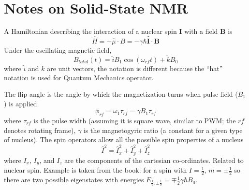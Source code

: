 \documentclass[12pt]{book}
\begin{document}
\section{Notes on Solid-State NMR}

A Hamiltonian describing the interaction of a nuclear spin $\mathbf{I}$
with a field $\mathbf{B}$ is 
\[
\hat{H}=-\hat{\mu}\cdot B=-\gamma\hbar\mathbf{\hat{I}}\cdot\mathbf{B}
\]
Under the oscillating magnetic field, 
\[
B_{total}\left(t\right)=\breve{i}B_{1}\cos\left(\omega_{rf}t\right)+\breve{k}B_{0}
\]
where $\breve{i}$ and $\breve{k}$ are unit vectors, the notation
is different because the ``hat'' notation is used for Quantum Mechanics
operator.

The flip angle is the angle by which the magnetization turns when
pulse field ($B_{1}$) is applied 
\[
\phi_{rf}=\omega_{1}\tau_{rf}=\gamma B_{1}\tau_{rf}
\]
where $\tau_{rf}$ is the pulse width (assuming it is square wave,
similar to PWM; the $rf$ denotes rotating frame), $\gamma$ is the
magnetogyric ratio (a constant for a given type of nucleus). The spin
operators allow all the possible spin properties of a nucleus 
\[
\hat{I}^{2}=\hat{I}_{x}^{2}+\hat{I}_{y}^{2}+\hat{I}_{z}^{2}
\]
where $I_{x}$, $I_{y}$, and $I_{z}$ are the components of the cartesian
co-ordinates. Related to nuclear spin. Example is taken from the book:
for a spin with $I=\frac{1}{2}$, $m=\pm\frac{1}{2}$ so there are
two possible eigenstates with energies $E_{\frac{1}{2},\pm\frac{1}{2}}=\mp\frac{1}{2}\gamma\hbar B_{0}$. 
\end{document}
